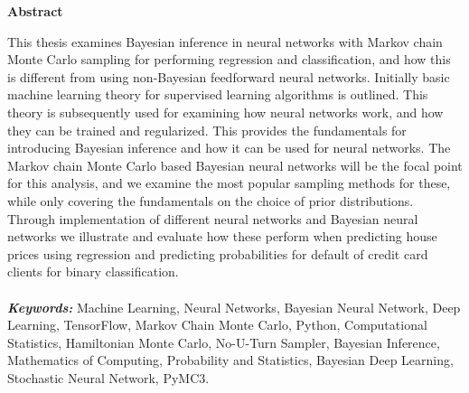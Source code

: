 \documentclass[a4paper, titlepage, openright]{book}
\providecommand{\keywords}[1]
{
  \small	
  \textbf{\textit{Keywords:}} #1
}
\numberwithin{mytheorem}{chapter}
\numberwithin{equation}{section}
\begin{document}
\thispagestyle{empty}


\begin{center}
    \Large
    \textbf{Abstract}
\end{center}
\vspace{0.9cm}
This thesis examines Bayesian inference in neural networks with Markov chain Monte Carlo sampling for performing regression and classification, and how this is different from using non-Bayesian feedforward neural networks. Initially basic machine learning theory for supervised learning algorithms is outlined. This theory is subsequently used for examining how neural networks work, and how they can be trained and regularized. This provides the fundamentals for introducing Bayesian inference and how it can be used for neural networks. The Markov chain Monte Carlo based Bayesian neural networks will be the focal point for this analysis, and we examine the most popular sampling methods for these, while only covering the fundamentals on the choice of prior distributions. Through implementation of different neural networks and Bayesian neural networks we illustrate and evaluate how these perform when predicting house prices using regression and predicting probabilities for default of credit card clients for binary classification.
\\
\\
\keywords{Machine Learning, Neural Networks, Bayesian Neural Network, Deep Learning, TensorFlow, Markov Chain Monte Carlo, Python, Computational Statistics, Hamiltonian Monte Carlo, No-U-Turn Sampler, Bayesian Inference, Mathematics of Computing, Probability and Statistics, Bayesian Deep Learning, Stochastic Neural Network, PyMC3.}
\end{document}
